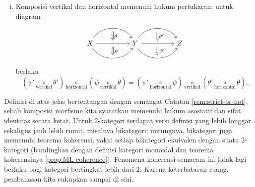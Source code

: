 \begin{definition}
\begin{enumerate}[(i)]
\[\begin{tikzcd}
		\arrow[bend right=40, rr, "{f'f}"', "" name=D]
		& & \arrow[Rightarrow, to path=(U) -- (D) \tikztonodes, "{\identity_{f'f}}"] Z .
	\end{tikzcd} \]
	\item Komposisi vertikal dan horizontal memenuhi hukum pertukaran: untuk diagram
		\[ \begin{tikzcd}
			X
			\arrow[bend left=60, rr, ""' name=U]
			\arrow[rr, "" name=MM, ""' name=M]
			\arrow[bend right=60, rr, "" name=D] & &
			\arrow[Rightarrow, to path=(U) -- (MM) \tikztonodes, "\theta"] \arrow[Rightarrow, to path=  (M) -- (D) \tikztonodes, "\psi"] Y
			\arrow[bend left=60, rr, ""' name=V]
			\arrow[rr, "" name=NN, ""' name=N]
			\arrow[bend right=60, rr, "" name=E] & &
			\arrow[Rightarrow, to path=(V) -- (NN) \tikztonodes, "\theta'"] \arrow[Rightarrow, to path=  (N) -- (E) \tikztonodes, "\psi'"] Z
		\end{tikzcd} \]
		berlaku
		\[ \left( \psi' \underset{\text{vertikal}}{\circ} \theta'\right) \underset{\text{horizontal}}{\circ} \left( \psi \underset{\text{vertikal}}{\circ} \theta\right) = \left( \psi' \underset{\text{horizontal}}{\circ} \psi \right) \underset{\text{vertikal}}{\circ} \left( \theta' \underset{\text{horizontal}}{\circ} \theta\right).  \]
	\end{enumerate}
\end{definition}

\begin{remark}
	Definisi di atas jelas bertentangan dengan semangat Catatan \ref{rem:strict-or-not}, sebab komposisi morfisme kita syaratkan memenuhi hukum asosiatif dan sifat identitas secara ketat. Untuk $2$-kategori terdapat versi definisi yang lebih longgar sekaligus jauh lebih rumit, misalnya bikategori; untungnya, bikategori juga memenuhi teorema koherensi, yakni setiap bikategori ekuivalen dengan suatu $2$-kategori (bandingkan dengan definisi kategori monoidal dan teorema koherensinya \ref{prop:ML-coherence}). Fenomena koherensi semacam ini tidak lagi berlaku bagi kategori bertingkat lebih dari $2$. Karena keterbatasan ruang, pembahasan kita cukupkan sampai di sini.
\end{remark}

